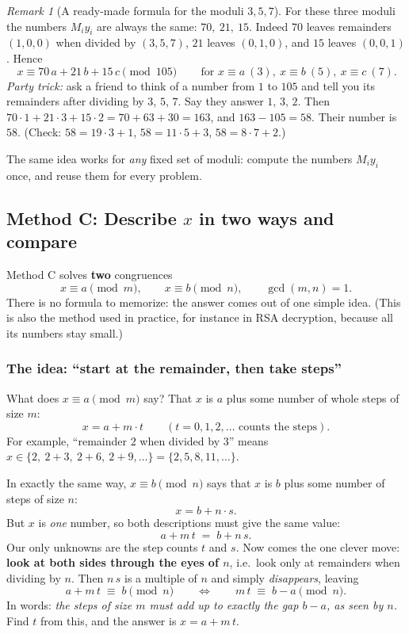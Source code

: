 \documentclass[11pt]{article}
\theoremstyle{definition}
\theoremstyle{remark}
\newtheorem{remark}[theorem]{Remark}
\begin{document}
\begin{remark}[A ready-made formula for the moduli $3,5,7$]
For these three moduli the numbers $M_iy_i$ are always the same: $70,\ 21,\ 15$. Indeed $70$ leaves remainders $(1,0,0)$ when divided by $(3,5,7)$, $21$ leaves $(0,1,0)$, and $15$ leaves $(0,0,1)$. Hence
\[
\boxed{\,x\equiv 70\,a+21\,b+15\,c \pmod{105}\,}\qquad\text{for } x\equiv a\ (3),\ x\equiv b\ (5),\ x\equiv c\ (7).
\]
\emph{Party trick:} ask a friend to think of a number from $1$ to $105$ and tell you its remainders after dividing by $3$, $5$, $7$. Say they answer $1,\,3,\,2$. Then $70\cdot1+21\cdot3+15\cdot2=70+63+30=163$, and $163-105=58$. Their number is $58$. (Check: $58=19\cdot3+1$, $58=11\cdot5+3$, $58=8\cdot7+2$.)

The same idea works for \emph{any} fixed set of moduli: compute the numbers $M_iy_i$ once, and reuse them for every problem.
\end{remark}

\subsection{Method C: Describe $x$ in two ways and compare}

Method C solves \textbf{two} congruences
\[
x\equiv a\pmod m,\qquad x\equiv b\pmod n,\qquad \gcd(m,n)=1.
\]
There is no formula to memorize: the answer comes out of one simple idea. (This is also the method used in practice, for instance in RSA decryption, because all its numbers stay small.)

\subsubsection*{The idea: ``start at the remainder, then take steps''}

What does $x\equiv a\pmod m$ say? That $x$ is $a$ plus some number of whole steps of size $m$:
\[
x = a + m\cdot t\qquad(t=0,1,2,\dots\text{ counts the steps}).
\]
For example, ``remainder $2$ when divided by $3$'' means $x\in\{2,\ 2+3,\ 2+6,\ 2+9,\dots\}=\{2,5,8,11,\dots\}$.

In exactly the same way, $x\equiv b\pmod n$ says that $x$ is $b$ plus some number of steps of size $n$:
\[
x = b + n\cdot s.
\]
But $x$ is \emph{one} number, so both descriptions must give the same value:
\[
a + m\,t \;=\; b + n\,s.
\]
Our only unknowns are the step counts $t$ and $s$. Now comes the one clever move: \textbf{look at both sides through the eyes of $n$}, i.e.\ look only at remainders when dividing by $n$. Then $n\,s$ is a multiple of $n$ and simply \emph{disappears}, leaving
\[
a + m\,t\;\equiv\; b \pmod n\qquad\Longleftrightarrow\qquad m\,t\;\equiv\; b-a \pmod n.
\]
In words: \emph{the steps of size $m$ must add up to exactly the gap $b-a$, as seen by $n$.} Find $t$ from this, and the answer is $x=a+m\,t$.
\end{document}
